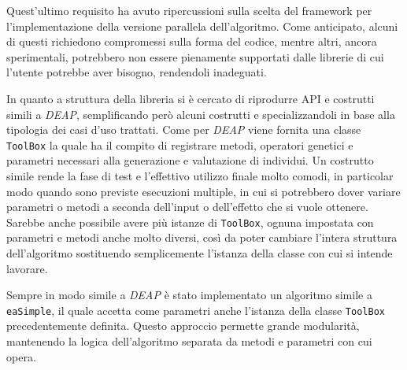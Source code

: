 Quest'ultimo requisito ha avuto ripercussioni sulla scelta del framework per
l'implementazione della versione parallela dell'algoritmo. Come anticipato,
alcuni di questi richiedono compromessi sulla forma del codice, mentre altri,
ancora sperimentali, potrebbero non essere pienamente supportati dalle librerie
di cui l'utente potrebbe aver bisogno, rendendoli inadeguati.

In quanto a struttura della libreria si è cercato di riprodurre API e costrutti
simili a \textit{DEAP}, semplificando però alcuni costrutti e specializzandoli
in base alla tipologia dei casi d'uso trattati. Come per \textit{DEAP} viene
fornita una classe \verb|ToolBox| la quale ha il compito di registrare metodi,
operatori genetici e parametri necessari alla generazione e valutazione di
individui. Un costrutto simile rende la fase di test e l'effettivo utilizzo
finale molto comodi, in particolar modo quando sono previste esecuzioni
multiple, in cui si potrebbero dover variare parametri o metodi a seconda
dell'input o dell'effetto che si vuole ottenere. Sarebbe anche possibile avere
più istanze di \verb|ToolBox|, ognuna impostata con parametri e metodi anche
molto diversi, così da poter cambiare l'intera struttura dell'algoritmo
sostituendo semplicemente l'istanza della classe con cui si intende lavorare.

Sempre in modo simile a \textit{DEAP} è stato implementato un algoritmo simile
a \verb|eaSimple|, il quale accetta come parametri anche l'istanza della classe
\verb|ToolBox| precedentemente definita. Questo approccio permette grande
modularità, mantenendo la logica dell'algoritmo separata da metodi e parametri
con cui opera.
